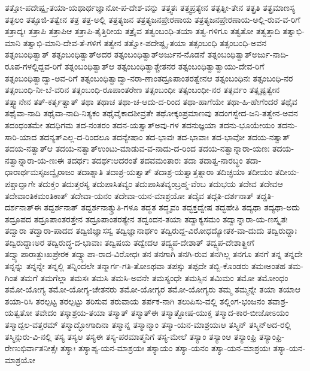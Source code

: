 {ತತ್ತೋ-ಪದೇಷ್ಟೃ-ತಯಾ-ಯಥಾರ್ಥಜ್ಞಾನೋ-ಪ-ದೇಶ-ವನ್ನು
ತತ್ತ್ವತಃ
ತತ್ತ್ವಪ್ರತ್ಯೇನ
ತತ್ಪತ್ನೀ-ತೇನ
ತತ್ಪ್ರತಿ
ತತ್ಪ್ರಮಾಣಸ್ಯ
ತತ್ಫಲಂ
ತತ್ಫೂಜಿ-ತತ್ವೇನ
ತತ್ರ
ತತ್ರ-ಅಲ್ಲಿ
ತತ್ರತ್ಯಜನ
ತತ್ರತ್ಯಜನಪ್ರೇರಣಾಯ
ತತ್ರತ್ಯಜನಪ್ರೇರಣಾಯ-ಅಲ್ಲಿ-ರುವ-ವ-ರಿಗೆ
ತತ್ರಾದ್ಯಃ
ತತ್ರಾಪಿ
ತತ್ರಾಪಿಆ
ತತ್ರಾಪಿ-ತೈತ್ತಿರೀಯ
ತತ್ರೈವ
ತತ್ವಂಬಂಧಿ-ತಯಾ
ತತ್ವ-ಗಳಿಗೂ
ತತ್ವತೋ
ತತ್ವತ್ತಾದಿ
ತತ್ವಾಭಿ-ಮಾನಿ
ತತ್ವಾಭಿ-ಮಾನಿ-ದೇವ-ತೆ-ಗಳಿಗೆ
ತತ್ವೇನ
ತತ್ವೋ-ಪದೇಷ್ಟೃ-ತಯಾ
ತತ್ಸಂಬಂಧಿ
ತತ್ಸಂಬಂಧಿ-ಅವನ
ತತ್ಸಂಬಂಧಿತ್ವಾತ್
ತತ್ಸಂಬಂಧಿತ್ವಾತ್ಅದರ
ತತ್ಸಂಬಂಧಿತ್ವಾತ್ಅರ್ಜುನ-ನೊಡನೆ
ತತ್ಸಂಬಂಧಿತ್ವಾತ್ಅರ್ಜು-ನಾದಿ-ರೂಪ-ಗಳಲ್ಲಿದ್ದವ-ರಿಗೆ
ತತ್ಸಂಬಂಧಿತ್ವಾತ್ಆ
ತತ್ಸಂಬಂಧಿತ್ವಾತ್ಚೇತನರ
ತತ್ಸಂಬಂಧಿತ್ವಾತ್ವಾಯು-ದೇವ-ರಿಗೆ
ತತ್ಸಂಬಂಧಿತ್ವಾದ್ವಾ-ಅವ-ರಿಗೆ
ತತ್ಸಂಬಂಧಿತ್ವಾದ್ವಾ-ನರಾ-ಣಾಂತದ್ರೂಪಾಂತರತ್ವೇನಆ
ತತ್ಸಂಬಂಧಿನಃ
ತತ್ಸಂಬಂಧಿ-ನರ
ತತ್ಸಂಬಂಧಿ-ನೀ-ಬೆ-ವರಿನ
ತತ್ಸಂಬಂಧಿ-ರೂಪಾಂತರೇಣ
ತತ್ಸಂಬಂಧೀ
ತತ್ಸಂಬಂಧೀ-ನರ
ತತ್ಸರ್ವಂ
ತತ್ಸೃಷ್ಟತ್ವೇನ
ತತ್ಸ್ವಾನೇನ
ತತ್‌-ಕರ್ತೃತ್ವಾತ್
ತಥಾ
ತಥಾಚ
ತಥಾ-ಚ-ಆದು-ದ-ರಿಂದ
ತಥಾ-ಹಾಗೆಯೇ
ತಥಾ-ಹಿ-ಹೇಗೆಂದರೆ
ತಥೈವ
ತಥೈವಾ-ನಾದಿ
ತಥೈವಾ-ನಾದಿ-ನಿತ್ಯಕಂ
ತಥೈವೈಕಾದಶೀವ್ರತೇ
ತಥೋಕ್ಕಂಪ್ರಮಾಣವು
ತದಂಗಸ್ವೇದ-ಜನಿ-ತತ್ವೇನ-ಅವನ
ತದಂಧಂತಮೇ
ತದಧಿಗಮ
ತದ-ನಂತರಂ
ತದನ-ಯತ್ವಾತ್ಅವು-ಗಳ
ತದನುಜ್ಞಯಾ
ತದನು-ಭೂಯೇಯಂ
ತದನು-ಸಾರಿ-ಯಾದ
ತದನ್ಯತ್ಎಲ್ಲ-ದ-ರಿಂದಲೂ
ತದನ್ಯೇಷಾಂ
ತದ-ಭಾವಃ
ತದ-ಭಾವಾಃ
ತದ-ಭಾವೋ
ತದಯ-ನತ್ವಾತ್
ತದಯ-ನತ್ವಾತ್ಆ
ತದಯ-ನತ್ವಾತ್ಉಂಟು-ಮಾಡುವ-ವ-ನಾದು-ದ-ರಿಂದ
ತದಯ-ನತ್ವಾನ್ನಾರಾ-ಯಣಃ
ತದಯ-ನತ್ವಾನ್ನಾರಾ-ಯ-ಣಃಈ
ತದರ್ಥಃ
ತದರ್ಥಃಆದರಂತೆ
ತದವಮಂತಾರಃ
ತದಾ
ತದಾತ್ವ-ನಾರಬ್ಧಂ
ತದಾ-ಧಾರಾರ್ಥಮಸೃಜದ್ವೈರಾಜಂ
ತದಾಶ್ನಾತಿ
ತದಾಶ್ರ-ಯತ್ವಾತ್
ತದಾಶ್ರ-ಯತ್ವಾತ್ತತ್ನಾರಾ
ತದಿಚ್ಛಯಾ
ತದೀಯಂ
ತದೀಯ-ಪಶ್ಚಾದ್ಘಾಗೇ
ತದುಕ್ತಂ
ತದುತ್ತರಸ್ಯ
ತದುಪಾಸಿತವ್ಯಂ
ತದುಪಾಸಿತವ್ಯಂಬ್ರಹ್ಮ-ವೆಂಬ
ತದುಭಯ
ತದೇವ
ತದೇವಆ
ತದೇವಾಂತಿಕಮಂತಿಕಾತ್
ತದೇವಾ-ಯನಂ
ತದೇವಾ-ಯನ-ಮಾಶ್ರಯೋ
ತದೈವ
ತದ್ಗತಿ-ದರ್ಶನಾತ್
ತದ್ದತಿ-ದರ್ಶನಾತ್ಈ
ತದ್ದರ್ಶನಾತ್
ತದ್ದರ್ಶನಾತ್ಶ್ರುತಿ-ಗಳೂ
ತದ್ಧತ
ತದ್ಧೃವಂ
ತದ್ಭಕ್ತದ್ವೇಷ
ತದ್ಭಹೇತಿ
ತದ್ಯಥಾ
ತದ್ಯಥಾ-ಅದು
ತದ್ರೂಪದ
ತದ್ರೂಪಾಂತರತ್ತೇನ
ತದ್ರೂಪಾಂತರತ್ಯೇನ
ತದ್ವಂದನ-ತಯಾ
ತದ್ವಾಕ್ಯಸಮಂ
ತದ್ವಾನ್ನಾರಾ-ಯ-ಣಸ್ಕೃತಃ
ತದ್ವಾರಾ
ತದ್ವಾರಾ-ಪಾದದ
ತದ್ವಿಜಿಜ್ಞಾಸಸ್ವ
ತದ್ವಿಜ್ಞಾನಾರ್ಥಂ
ತದ್ವಿರುದ್ದ-ವಿರೋಧದ್ಯೋತಕ-ವಾ-ದುದು
ತದ್ವಿರುದ್ದಾಃ
ತದ್ವಿರುದ್ದಾಃಅರ
ತದ್ವಿರುದ್ಧ-ದ-ಭಾವಾಃ
ತದ್ವಿಷಯ
ತದ್ವೇದಆ
ತದ್ವ್ಯಪ-ದೇಶಾತ್
ತದ್ವ್ಯಪ-ದೇಶಾತ್ಹೀಗೆ
ತದ್ವ್ಯಾಪಾರಾತ್ದುಃಖಪ್ರೇರಕ
ತದ್ವ್ಯಾಪಾ-ರಾದ-ವಿರೋಧಃ
ತನ
ತನಗಾಗಿ
ತನಗಿ-ರುವ
ತನಗಿಲ್ಲ
ತನಗೂ
ತನಗೆ
ತನ್ನ
ತನ್ನದೇ
ತನ್ನನ್ನು
ತನ್ನನ್ನೇ
ತನ್ನಲ್ಲಿ
ತನ್ನಿಂದಲೇ
ತನ್ಮಾರ್ಗ-ಗತಿ-ತೋಽಥವಾ
ತಪಸ್ಸು
ತಪ್ಪದೇ
ತಬ್ಬಿ-ಕೊಂಡರು
ತಮಃಅಂತಹ
ತಮ-ಗಿಂತ
ತಮಗೆ
ತಮಗೆಲ್ಲಾ
ತಮಸಃ
ತಮಸಿ
ತಮಸಿ-ಅವನೇ
ತಮಸ್ಯಂಧೇ
ತಮಸ್ಸಿನ
ತಮಿಮಂ
ತಮೋ
ತಮೋಂಧಂ
ತಮೋ-ಯೋಗ್ಯ
ತಮೋ-ಯೋಗ್ಯ-ಚೇತನರು
ತಮೋ-ಯೋಗ್ಯರ
ತಮೋ-ಯೋಗ್ಯರು
ತಮ್ಮ
ತಮ್ಮನ್ನೇ
ತಯಾ
ತಯಾಆ
ತಯಾ-ರಿಸಿ
ತರಲ್ಪಟ್ಟ
ತರಲ್ಪಟ್ಟು
ತರಿಸುವ
ತರುವಾಯ
ತರ್ಪಕ-ನಾಗಿ
ತಲುಪಿಸು-ವಲ್ಲಿ
ತಲ್ಲಿಂಗ-ಭಂಜನಂ
ತವಾಶ್ರ-ಯತ್ವತೋ
ತವೇದಂ
ತಸ್ಕಾಶ್ರಯ-ತಯಾ
ತಸ್ಮಾತ್
ತಸ್ಮಾತ್ಈ
ತಸ್ಮಾತ್ದೋಷ-ಯುಕ್ತ
ತಸ್ಮಾದ-ಕಾರ-ಬೀಜೋಽಯಂ
ತಸ್ಮಾದ್ಬಲ-ವತ್ತರಮ್
ತಸ್ಮಾದ್ಭೋಗಾದಿನಾ
ತಸ್ಮಾನ್ನ
ತಸ್ಮಾನ್ಮಾಂ
ತಸ್ಮಾ-ಯನ-ಮಾಶ್ರಯಃಆ
ತಸ್ಮಿನ್
ತಸ್ಮಿನ್ಅದ-ರಲ್ಲಿ
ತಸ್ಮಿನ್ಗುರು-ವಿ-ನಲ್ಲಿ
ತಸ್ಯ
ತಸ್ಯಆ
ತಸ್ಯಈ
ತಸ್ಯ-ಪರಮಾತ್ಮನಿಗೆ
ತಸ್ಯ-ಮೇಲೆ
ತಸ್ಯಾಂ
ತಸ್ಯಾಂಆ
ತಸ್ಯಾಂಫ್ರಿ
ತಸ್ಯಾಂಫ್ರಿ-ರೇಣುಭಿರ್ವಾತನೀತ್ಸೆಃ
ತಸ್ಯಾಃ
ತಸ್ಯಾಪ್ಯ-ಯನ-ಮಾಶ್ರಯಃ
ತಸ್ಯಾಯಂ
ತಸ್ಯಾ-ಯನಂ
ತಸ್ಯಾ-ಯನ-ಮಾಶ್ರಯಃ
ತಸ್ಯಾ-ಯನ-ಮಾಶ್ರಯೋ
}
